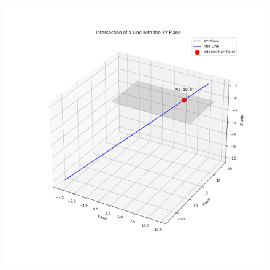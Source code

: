 \documentclass[journal]{IEEEtran}
\begin{document}
\begin{figure}[h!]
   \centering
   \includegraphics[width=0.7\columnwidth]{figs/fig1.png}
   \caption{}
   \label{Figure}
\end{figure}
\end{document}
